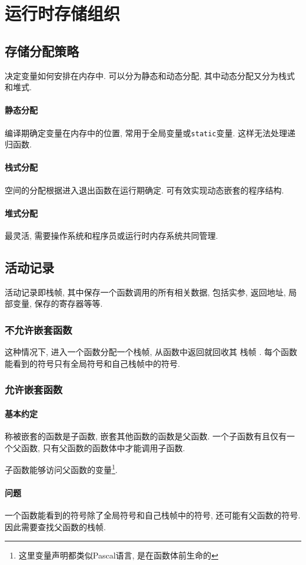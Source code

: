 \documentclass{ctexart}
\begin{document}
\section{运行时存储组织}
\subsection{存储分配策略}
    决定变量如何安排在内存中. 可以分为静态和动态分配, 其中动态分配又分为栈式和堆式.
\paragraph{静态分配} 
    编译期确定变量在内存中的位置, 常用于全局变量或\verb/static/变量.
    这样无法处理递归函数.
\paragraph{栈式分配}
    空间的分配根据进入退出函数在运行期确定.
    可有效实现动态嵌套的程序结构.
\paragraph{堆式分配}
    最灵活, 需要操作系统和程序员或运行时内存系统共同管理.
\subsection{活动记录}
    活动记录即栈帧, 其中保存一个函数调用的所有相关数据, 包括实参, 返回地址, 局部变量, 保存的寄存器等等.\par
\subsubsection{不允许嵌套函数}
    这种情况下, 进入一个函数分配一个栈帧, 从函数中返回就回收其 栈帧 .
    每个函数能看到的符号只有全局符号和自己栈帧中的符号.
\subsubsection{允许嵌套函数}
\paragraph{基本约定} 
    称被嵌套的函数是子函数, 嵌套其他函数的函数是父函数.
    一个子函数有且仅有一个父函数, 只有父函数的函数体中才能调用子函数.\par
    子函数能够访问父函数的变量\footnote{这里变量声明都类似Pascal语言, 是在函数体前生命的}.
\paragraph{问题}
    一个函数能看到的符号除了全局符号和自己栈帧中的符号, 还可能有父函数的符号.
    因此需要查找父函数的栈帧.
\end{document}
